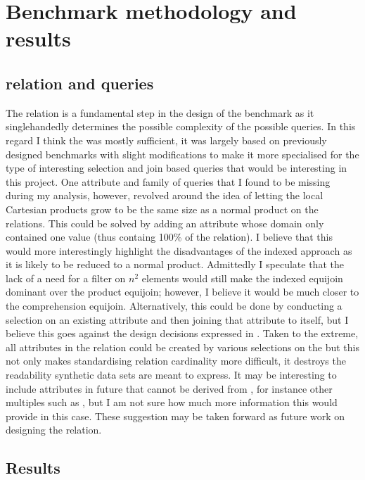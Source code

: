 \section{Benchmark methodology and results}
\subsection{ relation and queries}
The  relation is a fundamental step in the design of
the benchmark as it singlehandedly determines the possible complexity of the
possible queries. In this regard I think the  was mostly
sufficient, it was largely based on previously designed benchmarks with slight
modifications to make it more specialised for the type of interesting
selection and join based queries that would be interesting in this project. One
attribute and family of queries that I found to be missing during my analysis,
however, revolved around the idea of letting the local Cartesian products grow
to be the same size as a normal product on the relations. This could be solved
by adding an attribute  whose domain only
contained one value (thus containg 100\% of the relation). I believe that this
would more interestingly highlight the disadvantages of the indexed approach as
it is likely to be reduced to a normal product. Admittedly I speculate that the lack of a need
for a filter on $n^2$ elements would still make the indexed equijoin dominant
over the product equijoin; however, I believe it would be much closer to the
comprehension equijoin. Alternatively, this could be done by conducting a
selection on an existing attribute and then joining that attribute to itself,
but I believe this goes against the design decisions expressed in
. Taken to the extreme, all
attributes in the relation could be created by various selections on the
 but this not only makes standardising relation
cardinality more difficult, it destroys the readability synthetic data sets are
meant to express. It may be interesting to include attributes in future that
cannot be derived from , for instance other
multiples such as , but I am not sure how much more
information this would provide in this case. These suggestion may be taken
forward as future work on designing the  relation.

\subsection{Results}
